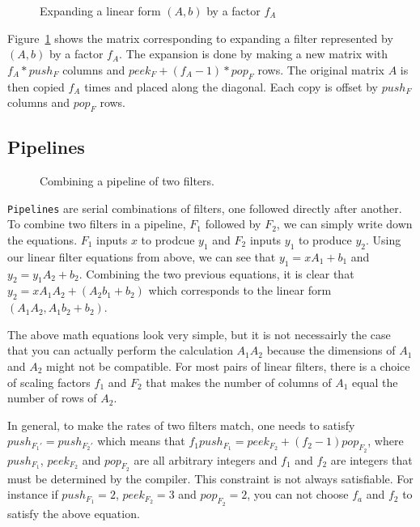 \begin{figure}
\center
\epsfxsize=3.0in
\caption{Expanding a linear form $(A,b)$ by a factor $f_{A}$}
\label{fig:expanding-a-matrix}
\end{figure}

Figure~\ref{fig:expanding-a-matrix} shows the matrix corresponding to expanding 
a filter represented by $(A,b)$ by a factor $f_{A}$. The expansion is done by 
making a new matrix with $f_{A}*push_{F}$ columns and $peek_{F}+(f_{A}-1)*pop_{F}$
rows. The original matrix $A$ is then copied $f_{A}$ times and placed along the
diagonal. Each copy is offset by $push_{F}$ columns and $pop_{F}$ rows.

\subsection{Pipelines}

\begin{figure}
\center
\epsfxsize=3.0in
\caption{Combining a pipeline of two filters.}
\label{fig:combining-pipeline}
\end{figure}

{\tt Pipelines} are serial combinations of filters, one followed directly after 
another. To combine two filters in a pipeline, $F_{1}$ followed by $F_{2}$, we can
simply write down the equations. $F_{1}$ inputs $x$ to prodcue $y_1$ and $F_{2}$
inputs $y_1$ to produce $y_2$. Using our linear filter equations from above,
we can see that $y_1 = xA_1 + b_1$ and $y_2 = y_1A_2 + b_2$. Combining the
two previous equations, it is clear that $y_2 = xA_1A_2 + (A_2b_1 + b_2)$ 
which corresponds to the linear form $(A_1A_2, A_1b_2+b_2)$. 

The above math equations look very simple, but it is not necessairly the case
that you can actually perform the calculation $A_1A_2$ because the dimensions of 
$A_1$ and $A_2$ might not be compatible. For most pairs of linear filters, there
is a choice of scaling factors $f_1$ and $F_2$ that makes the number of columns 
of $A_1$ equal the number of rows of $A_2$.

In general, to make the rates of two filters match, one needs to satisfy
$push_{F_{1}'} = push_{F_{2}'}$ which means that 
$f_1push_{F_1}=peek_{F_2}+(f_2-1)pop_{F_2}$, where $push_{F_1}$,
$peek_{F_2}$ and $pop_{F_2}$ are all arbitrary integers and 
$f_1$ and $f_2$ are integers that must be determined by the compiler.
This constraint is not always satisfiable. For instance if
$push_{F_1}=2$, $peek_{F_2}=3$ and $pop_{F_2}=2$, you can not
choose $f_a$ and $f_2$ to satisfy the above equation.

